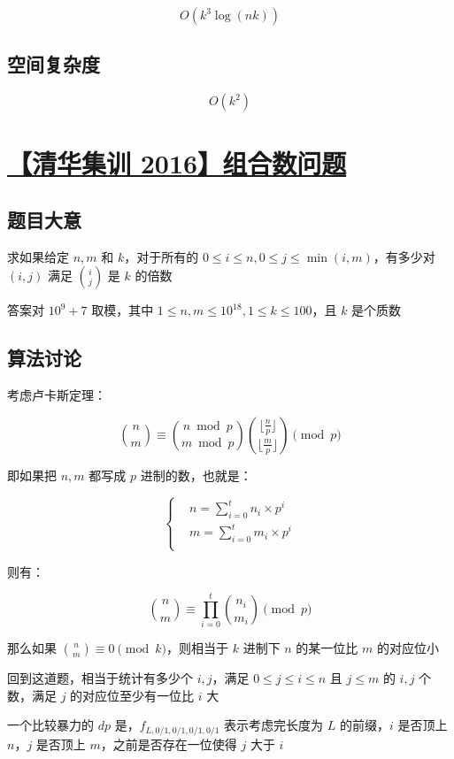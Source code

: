 \documentclass[UTF8]{article}
\begin{document}
$$
O(k^3 \log (nk))
$$

\subsection{空间复杂度}

$$
O(k^2)
$$

\section{\href{http://uoj.ac/problem/275}{【清华集训 2016】组合数问题}}

\subsection{题目大意}

求如果给定 $n,m$ 和 $k$，对于所有的 $0 \le i \le n, 0 \le j \le \min(i, m)$，有多少对 $(i, j)$ 满足 ${i \choose j}$ 是 $k$ 的倍数

答案对 $10^9+7$ 取模，其中 $1 \le n,m \le 10^{18}, 1 \le k \le 100$，且 $k$ 是个质数

\subsection{算法讨论}

考虑卢卡斯定理：

$$
{n \choose m} \equiv {n \bmod p \choose m \bmod p} {\lfloor\frac{n}{p} \rfloor \choose \lfloor \frac{m}{p} \rfloor} \pmod {p}
$$

即如果把 $n, m$ 都写成 $p$ 进制的数，也就是：

$$
\begin{cases}
&n = \sum_{i=0}^{t} n_i \times p^i \\
&m = \sum_{i=0}^{t} m_i \times p^i \\
\end{cases}
$$

则有：

$$
{n \choose m} \equiv \prod_{i=0}^{t} {n_i \choose m_i} \pmod {p}
$$

那么如果 ${n \choose m} \equiv 0 \pmod {k}$，则相当于 $k$ 进制下 $n$ 的某一位比 $m$ 的对应位小

回到这道题，相当于统计有多少个 $i, j$，满足 $0 \le j \le i \le n$ 且 $j \le m$ 的 $i, j$ 个数，满足 $j$ 的对应位至少有一位比 $i$ 大

一个比较暴力的 $dp$ 是，$f_{L,0/1,0/1,0/1,0/1}$ 表示考虑完长度为 $L$ 的前缀，$i$ 是否顶上 $n$，$j$ 是否顶上 $m$，之前是否存在一位使得 $j$ 大于 $i$
\end{document}
